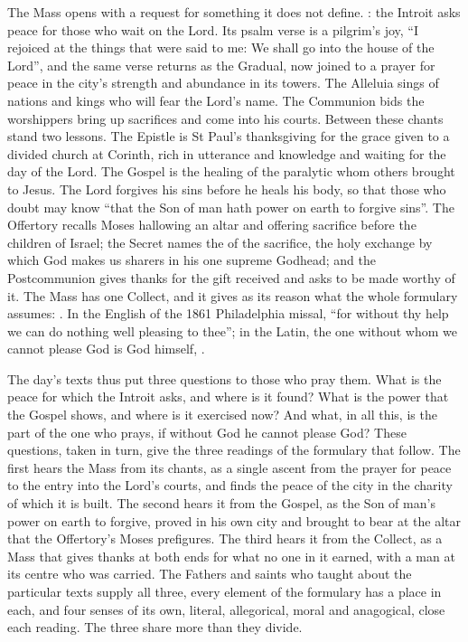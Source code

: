 The Mass opens with a request for something it does not define. : the Introit asks peace for those who wait on
the Lord. Its psalm verse is a pilgrim's joy, ``I rejoiced at the things that were said to me: We
shall go into the house of the Lord'', and the same verse returns as the
Gradual, now joined to a prayer for peace in the city's strength and
abundance in its towers. The Alleluia sings of nations and kings who will fear
the Lord's name. The Communion bids the worshippers bring up sacrifices and
come into his courts. Between these chants stand two lessons. The Epistle is
St Paul's thanksgiving for the grace given to a divided church at Corinth,
rich in utterance and knowledge and waiting for the day of the Lord. The Gospel
is the healing of the paralytic whom others brought to Jesus. The Lord forgives
his sins before he heals his body, so that those who doubt may know ``that the
Son of man hath power on earth to forgive sins''. The Offertory recalls Moses
hallowing an altar and offering sacrifice before the children of Israel; the
Secret names the  of the sacrifice, the holy
exchange by which God makes us sharers in his one supreme Godhead; and the
Postcommunion gives thanks for the gift received and asks to be made worthy of
it. The Mass has one Collect, and it gives as its reason what the whole
formulary assumes: . In the
English of the 1861 Philadelphia missal, ``for without thy help we can do
nothing well pleasing to thee''; in the Latin, the one without whom we cannot
please God is God himself, .

The day's texts thus put three questions to those who pray them. What is the
peace for which the Introit asks, and where is it found? What is the power
that the Gospel shows, and where is it exercised now? And what, in all this,
is the part of the one who prays, if without God he cannot please God? These
questions, taken in turn, give the three readings of the formulary that
follow. The first hears the Mass from its chants, as a single ascent from the prayer
for peace to the entry into the Lord's courts, and finds the peace of the
city in the charity of which it is built. The second hears it from the
Gospel, as the Son of man's power on earth to forgive, proved in his own city and
brought to bear at the altar that the Offertory's Moses prefigures. The third
hears it from the Collect, as a Mass that gives thanks at both ends for what
no one in it earned, with a man at its centre who was carried. The Fathers
and saints who taught about the particular texts supply all three, every
element of the formulary has a place in each, and four senses of its own,
literal, allegorical, moral and anagogical, close each reading. The three
share more than they divide.

